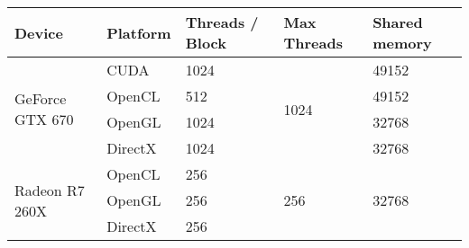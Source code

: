 \begin{tabular}{|l|l|l|l|l|}
	\hline
	Device & Platform & Threads / Block & Max Threads & Shared memory \\ \hline
	\multirow{4}{*}{GeForce GTX 670} & CUDA & 1024 & \multirow{4}{*}{1024} & 49152 \\
	& OpenCL & 512 & {} & 49152 \\
	& OpenGL & 1024 & {} & 32768 \\
	& DirectX & 1024 & {} & 32768 \\ \hline
	\multirow{3}{*}{Radeon R7 260X} & OpenCL & 256 & \multirow{3}{*}{256} & \multirow{3}{*}{32768} \\
	& OpenGL & 256 & {} & {} \\
	& DirectX & 256 & {} & {} \\ \hline
\end{tabular}